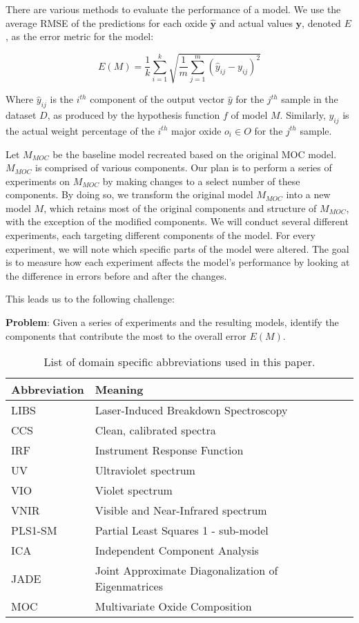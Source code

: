 There are various methods to evaluate the performance of a model.
We use the average RMSE of the predictions for each oxide $\mathbf{\hat{y}}$ and actual values $\mathbf{y}$, denoted $E$, as the error metric for the model:

\begin{equation}\label{eq:avg_rmse_metric}
    E(M) = \frac{1}{k} \sum_{i=1}^{k} \sqrt{\frac{1}{m} \sum_{j=1}^{m} (\hat{y}_{ij} - y_{ij})^2}
\end{equation}

Where \( \hat{y}_{ij} \) is the \( i^{th} \) component of the output vector \( \hat{y} \) for the \( j^{th} \) sample in the dataset \( D \), as produced by the hypothesis function \( f \) of model \( M \). Similarly, \( y_{ij} \) is the actual weight percentage of the \( i^{th} \) major oxide \( o_i \in O \) for the \( j^{th} \) sample.

Let $M_{MOC}$ be the baseline model recreated based on the original MOC model. $M_{MOC}$ is comprised of various components.
Our plan is to perform a series of experiments on $M_{MOC}$ by making changes to a select number of these components.
By doing so, we transform the original model $M_{MOC}$ into a new model $M$, which retains most of the original components and structure of $M_{MOC}$, with the exception of the modified components.
We will conduct several different experiments, each targeting different components of the model.
For every experiment, we will note which specific parts of the model were altered.
The goal is to measure how each experiment affects the model's performance by looking at the difference in errors before and after the changes.

This leads us to the following challenge:

\textbf{Problem}: Given a series of experiments and the resulting models, identify the components that contribute the most to the overall error $E(M)$.

\begin{table}
\centering
\begin{tabular}{ll}
\toprule
Abbreviation & Meaning \\
\midrule
LIBS & Laser-Induced Breakdown Spectroscopy \\
CCS & Clean, calibrated spectra \\
IRF & Instrument Response Function \\
UV & Ultraviolet spectrum \\
VIO & Violet spectrum \\
VNIR & Visible and Near-Infrared spectrum \\
PLS1-SM & Partial Least Squares 1 - sub-model \\
ICA & Independent Component Analysis \\
JADE & Joint Approximate Diagonalization of Eigenmatrices \\
MOC & Multivariate Oxide Composition \\
\bottomrule
\end{tabular}
\caption{List of domain specific abbreviations used in this paper.}
\label{tab:abbreviations}
\end{table}